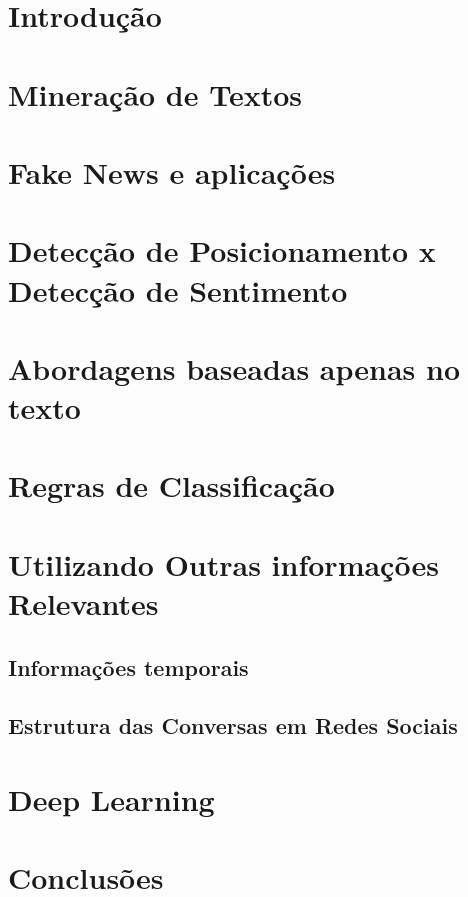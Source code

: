 \section{Introdução}

\section{Mineração de Textos}

\section{Fake News e aplicações}

\section{Detecção de Posicionamento x Detecção de Sentimento}

\section{Abordagens baseadas apenas no texto}

\section{Regras de Classificação}

\section{Utilizando Outras informações Relevantes}

\subsection{Informações temporais}

\subsection{Estrutura das Conversas em Redes Sociais}

\section{Deep Learning}

\section{Conclusões}
